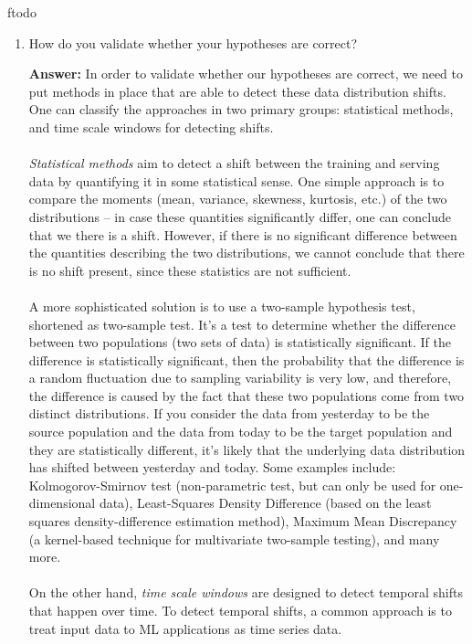 ƒtodo\documentclass{article}
\newenvironment{QandA}{\begin{enumerate}[label=\arabic*.]}{\end{enumerate}}
\newenvironment{InnerQandA}{\begin{enumerate}[label=\roman*.]}{\end{enumerate}}
\newenvironment{ListAlph}{\begin{enumerate}[label=(\alph*)]}{\end{enumerate}}
\newenvironment{answer}{\par\normalfont \textbf{Answer:}}{}
\begin{document}
\begin{QandA}
\begin{InnerQandA}
\begin{answer}
\begin{ListAlph}
            \end{ListAlph}
        \end{answer}

        \item How do you validate whether your hypotheses are correct?
        \begin{answer}
            In order to validate whether our hypotheses are correct, we need to put methods in place that are able to detect these data distribution shifts. One can classify the approaches in two primary groups: statistical methods, and time scale windows for detecting shifts.\\\\
            \textit{Statistical methods} aim to detect a shift between the training and serving data by quantifying it in some statistical sense. One simple approach is to compare the moments (mean, variance, skewness, kurtosis, etc.) of the two distributions -- in case these quantities significantly differ, one can conclude that we there is a shift. However, if there is no significant difference between the quantities describing the two distributions, we cannot conclude that there is no shift present, since these statistics are not sufficient. \\\\
            A more sophisticated solution is to use a two-sample hypothesis test, shortened as two-sample test. It’s a test to determine whether the difference between two populations (two sets of data) is statistically significant. If the difference is statistically significant, then the probability that the difference is a random fluctuation due to sampling variability is very low, and therefore, the difference is caused by the fact that these two populations come from two distinct distributions. If you consider the data from yesterday to be the source population and the data from today to be the target population and they are statistically different, it’s likely that the underlying data distribution has shifted between yesterday and today. Some examples include: Kolmogorov-Smirnov test (non-parametric test, but can only be used for one-dimensional data), Least-Squares Density Difference (based on the least squares density-difference estimation method), Maximum Mean Discrepancy (a kernel-based technique for multivariate two-sample testing), and many more. \\\\
            On the other hand, \textit{time scale windows} are designed to detect temporal shifts that happen over time. To detect temporal shifts, a common approach is to treat input data to ML applications as time series data. \\\\

\end{answer}
\end{InnerQandA}
\end{QandA}
\end{document}
